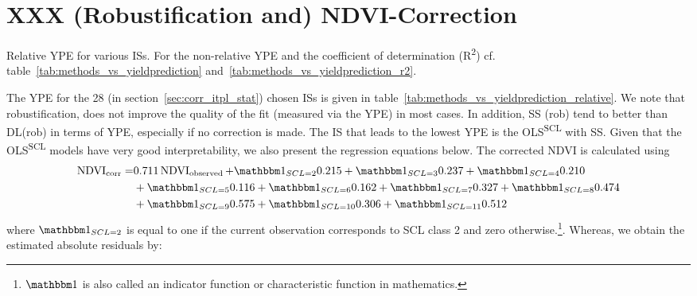 \section{XXX (Robustification and) NDVI-Correction} \label{sec:results_ndvi_corr}
	\begin{table}
		\begin{center}
			\caption[Relative Yield Estimation Error for ISs]{Relative YPE for various ISs. For the non-relative YPE and the coefficient of determination (R\textsuperscript{2}) cf. table~\ref{tab:methods_vs_yieldprediction} and~\ref{tab:methods_vs_yieldprediction_r2}.}
			\small
			
			\label{tab:methods_vs_yieldprediction_relative}
			\normalsize
		\end{center}
	\end{table}
	The YPE for the 28 (in section~\ref{sec:corr_itpl_stat}) chosen {{IS}}s is given in table~\ref{tab:methods_vs_yieldprediction_relative}. We note that robustification, does not improve the quality of the fit (measured via the YPE) in most cases. 
	In addition, SS (rob) tend to better than DL(rob) in terms of YPE, especially if no correction is made. The {{IS}} that leads to the lowest YPE is the OLS\textsuperscript{SCL} with SS. Given that the OLS\textsuperscript{SCL} models have very good interpretability, we also present the regression equations below. The corrected NDVI is calculated using 
	\begin{equation}\label{eq:corr_lm}
		\begin{aligned}		
			{\operatorname{NDVI}}_{\text{corr}}  = &
			0.711 \operatorname{NDVI}_\text{observed}  
			+ \mathbbm 1_{{SCL = 2}} 0.215 
			+ \mathbbm 1_{{SCL = 3}} 0.237 
			+ \mathbbm 1_{{SCL = 4}} 0.210 \\ &
			+ \mathbbm 1_{{SCL = 5}} 0.116 
			+ \mathbbm 1_{{SCL = 6}} 0.162 
			+ \mathbbm 1_{{SCL = 7}} 0.327 
			+ \mathbbm 1_{{SCL = 8}} 0.474 \\ &
			+ \mathbbm 1_{{SCL = 9}} 0.575 
			+ \mathbbm 1_{{SCL = 10}} 0.306 
			+ \mathbbm 1_{{SCL = 11}} 0.512 
		\end{aligned}
	\end{equation} 
	where $\mathbbm 1_{{SCL = 2}}$ is equal to one if the current observation corresponds to SCL class 2 and zero otherwise.\footnote{$\mathbbm 1$ is also called an indicator function or characteristic function in mathematics.}. Whereas, we obtain the estimated absolute residuals by: 

